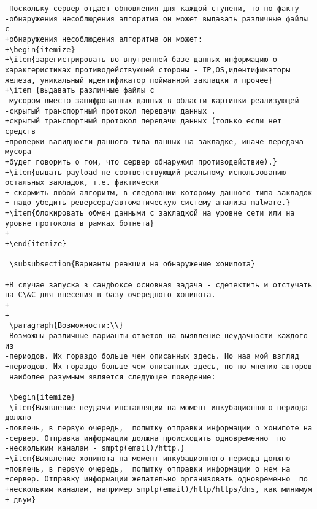 \begin{verbatim}
 Поскольку сервер отдает обновления для каждой ступени, то по факту
-обнаружения несоблюдения алгоритма он может выдавать различные файлы с
+обнаружения несоблюдения алгоритма он может:
+\begin{itemize}
+\item{зарегистрировать во внутренней базе данных информацию о характеристиках противодействующей стороны - IP,OS,идентификаторы железа, уникальный идентификатор пойманной закладки и прочее}
+\item {выдавать различные файлы с
 мусором вместо зашифрованных данных в области картинки реализующей
-скрытый транспортный протокол передачи данных .
+скрытый транспортный протокол передачи данных (только если нет средств
+проверки валидности данного типа данных на закладке, иначе передача мусора
+будет говорить о том, что сервер обнаружил противодействие).}
+\item{выдать payload не соответствующий реальному использованию остальных закладок, т.е. фактически
+ скормить любой алгоритм, в следовании которому данного типа закладок
+ надо убедить реверсера/автоматическую систему анализа malware.}
+\item{блокировать обмен данными с закладкой на уровне сети или на уровне протокола в рамках ботнета}
+
+\end{itemize}

 \subsubsection{Варианты реакции на обнаружение хонипота}

+В случае запуска в сандбоксе основная задача - сдетектить и отстучать на C\&C для внесения в базу очередного хонипота.
+
+
 \paragraph{Возможности:\\}
 Возможны различные варианты ответов на выявление неудачности каждого из
-периодов. Их гораздо больше чем описанных здесь. Но наа мой взгляд
+периодов. Их гораздо больше чем описанных здесь, но по мнению авторов
 наиболее разумным является следующее поведение:

 \begin{itemize}
-\item{Выявление неудачи инсталляции на момент инкубационного периода должно
-повлечь, в первую очередь,  попытку отправки информации о хонипоте на
-сервер. Отправка информации должна происходить одновременно  по
-нескольким каналам - smptp(email)/http.}
+\item{Выявление хонипота на момент инкубационного периода должно
+повлечь, в первую очередь,  попытку отправки информации о нем на
+сервер. Отправку информации желательно организовать одновременно  по
+нескольким каналам, например smptp(email)/http/https/dns, как минимум
+ двум}


\end{verbatim}
